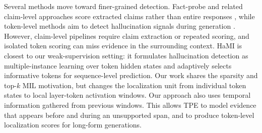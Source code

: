 Several methods move toward finer-grained detection. Fact-probe and
related claim-level approaches score extracted claims rather than
entire responses
\citep{snyder2024,he2024}, while token-level methods aim to detect
hallucination signals during generation
\citep{he2024,su2024}. However, claim-level pipelines require claim
extraction or repeated scoring, and isolated token scoring can miss
evidence in the surrounding context. HaMI \citep{niu2025hami} is
closest to our weak-supervision setting: it formulates hallucination
detection as multiple-instance learning over token hidden states and
adaptively selects informative tokens for sequence-level prediction.
Our work shares the sparsity and top-$k$ MIL motivation, but changes
the localization unit from individual token states to local
layer-token activation windows. Our approach also uses temporal information gathered from previous windows. 
This allows TPE to model evidence
that appears before and during an unsupported span, and to
produce token-level localization scores for long-form generations.